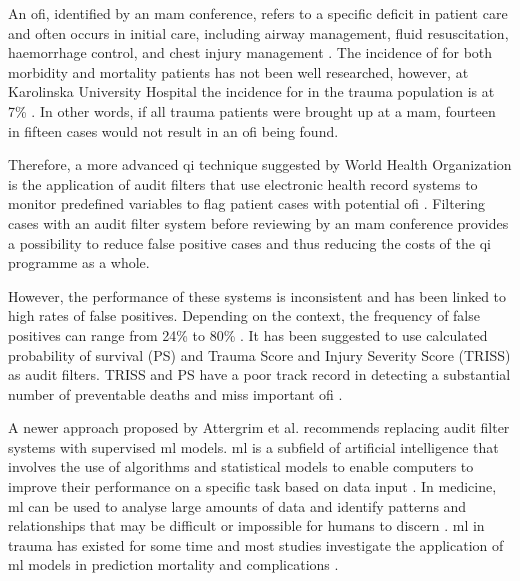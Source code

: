 \documentclass[12pt, a4paper]{article}
\begin{document}
An \acrshort{ofi}, identified by an \acrshort{mam} conference, refers to a specific deficit in patient care and often occurs in initial care, including airway management, fluid resuscitation, haemorrhage control, and chest injury management \cite{world_health_organization_guidelines_2009,roy_learning_2017,oreilly_opportunities_2013,sanddal_analysis_2011}. The incidence of  for both morbidity and mortality patients has not been well researched, however, at Karolinska University Hospital the incidence for  in the trauma population is at 7\% \cite{attergrim_predicting_2023}. In other words, if all trauma patients were brought up at a \acrshort{mam}, fourteen in fifteen cases would not result in an \acrshort{ofi} being found.

Therefore, a more advanced \acrshort{qi} technique suggested by World Health Organization is the application of audit filters that use electronic health record systems to monitor predefined variables to flag patient cases with potential \acrfull{ofi} \cite{world_health_organization_guidelines_2009}. Filtering cases with an audit filter system before reviewing by an \acrshort{mam} conference provides a possibility to reduce false positive cases and thus reducing the costs of the \acrshort{qi} programme as a whole.

However, the performance of these systems is inconsistent and has been linked to high rates of false positives. Depending on the context, the frequency of false positives can range from 24\% to 80\% \cite{attergrim_predicting_2023,sanddal_analysis_2011,roy_learning_2017,ghorbani_analysis_2018}. It has been suggested to use calculated probability of survival (PS) and Trauma Score and Injury Severity Score (TRISS) as audit filters. TRISS and PS have a poor track record in detecting a substantial number of preventable deaths and miss important \acrshort{ofi} \cite{heim_survival_2016}.

A newer approach proposed by Attergrim et al. \cite{attergrim_predicting_2023} recommends replacing audit filter systems with supervised \acrfull{ml} models. \acrshort{ml} is a subfield of artificial intelligence that involves the use of algorithms and statistical models to enable computers to improve their performance on a specific task based on data input \cite{greener_guide_2022}. In medicine, \acrshort{ml} can be used to analyse large amounts of data and identify patterns and relationships that may be difficult or impossible for humans to discern \cite{greener_guide_2022}. \acrshort{ml} in trauma has existed for some time and most studies investigate the application of \acrshort{ml} models in prediction mortality and complications \cite{zhang_machine_2022}.
\end{document}
